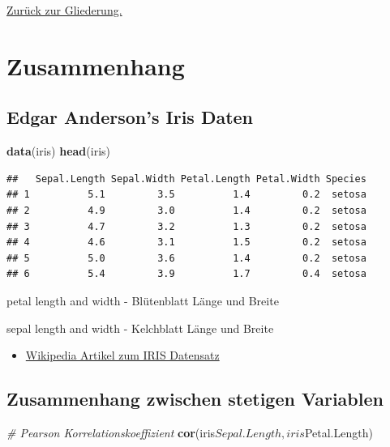 \documentclass[]{article}
\newenvironment{Shaded}{\begin{snugshade}}{\end{snugshade}}
\newcommand{\KeywordTok}[1]{\textcolor[rgb]{0.13,0.29,0.53}{\textbf{{#1}}}}
\newcommand{\CommentTok}[1]{\textcolor[rgb]{0.56,0.35,0.01}{\textit{{#1}}}}
\newcommand{\NormalTok}[1]{{#1}}
\providecommand{\tightlist}{%
  \setlength{\itemsep}{0pt}\setlength{\parskip}{0pt}}
\begin{document}
\href{https://github.com/Japhilko/IntroR/blob/master/2017/README.md}{Zurück
zur Gliederung.}

\section{Zusammenhang}\label{zusammenhang}

\subsection{Edgar Anderson's Iris
Daten}\label{edgar-andersons-iris-daten}

\begin{Shaded}
\begin{Highlighting}[]
\KeywordTok{data}\NormalTok{(iris)}
\KeywordTok{head}\NormalTok{(iris)}
\end{Highlighting}
\end{Shaded}

\begin{verbatim}
##   Sepal.Length Sepal.Width Petal.Length Petal.Width Species
## 1          5.1         3.5          1.4         0.2  setosa
## 2          4.9         3.0          1.4         0.2  setosa
## 3          4.7         3.2          1.3         0.2  setosa
## 4          4.6         3.1          1.5         0.2  setosa
## 5          5.0         3.6          1.4         0.2  setosa
## 6          5.4         3.9          1.7         0.4  setosa
\end{verbatim}

petal length and width - Blütenblatt Länge und Breite

sepal length and width - Kelchblatt Länge und Breite

\begin{itemize}
\tightlist
\item
  \href{https://en.wikipedia.org/wiki/Iris_flower_data_set}{Wikipedia
  Artikel zum IRIS Datensatz}
\end{itemize}

\subsection{Zusammenhang zwischen stetigen
Variablen}\label{zusammenhang-zwischen-stetigen-variablen}

\begin{Shaded}
\begin{Highlighting}[]
\CommentTok{# Pearson Korrelationskoeffizient}
\KeywordTok{cor}\NormalTok{(iris$Sepal.Length,iris$Petal.Length)}
\end{Highlighting}
\end{Shaded}
\end{document}
